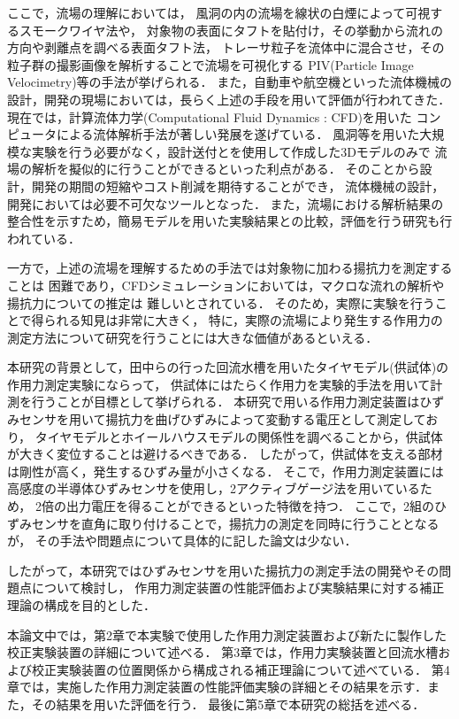 ここで，流場の理解においては，
風洞の内の流場を線状の白煙によって可視するスモークワイヤ法\cite{1994_smokewire}や，
対象物の表面にタフトを貼付け，その挙動から流れの方向や剥離点を調べる表面タフト法\cite{1994_taft}，
トレーサ粒子を流体中に混合させ，その粒子群の撮影画像を解析することで流場を可視化する
PIV(Particle Image Velocimetry)\cite{1999_PIV}等の手法が挙げられる．
また，自動車や航空機といった流体機械の設計，開発の現場においては，長らく上述の手段を用いて評価が行われてきた．\cite{1974_automobile}
現在では，計算流体力学(Computational Fluid Dynamics : CFD)を用いた
コンピュータによる流体解析手法が著しい発展を遂げている．
風洞等を用いた大規模な実験を行う必要がなく，設計送付とを使用して作成した3Dモデルのみで
流場の解析を擬似的に行うことができるといった利点がある．
そのことから設計，開発の期間の短縮やコスト削減を期待することができ，
流体機械の設計，開発\cite{2013_aircraft}\cite{1996_ship}においては必要不可欠なツールとなった．
また，流場における解析結果の整合性を示すため，簡易モデルを用いた実験結果との比較，評価を行う研究\cite{2007_CFD_comparison}も行われている．

一方で，上述の流場を理解するための手法では対象物に加わる揚抗力を測定することは
困難であり，CFDシミュレーションにおいては，マクロな流れの解析や揚抗力についての推定は
難しいとされている．\cite{2001_CFD_kobe}
そのため，実際に実験を行うことで得られる知見は非常に大きく，
特に，実際の流場により発生する作用力の測定方法について研究を行うことには大きな価値があるといえる．

本研究の背景として，田中ら\cite{2019_master}の行った回流水槽を用いたタイヤモデル(供試体)の作用力測定実験にならって，
供試体にはたらく作用力を実験的手法を用いて計測を行うことが目標として挙げられる．
本研究で用いる作用力測定装置はひずみセンサを用いて揚抗力を曲げひずみによって変動する電圧として測定しており，
タイヤモデルとホイールハウスモデルの関係性を調べることから，供試体が大きく変位することは避けるべきである．
したがって，供試体を支える部材は剛性が高く，発生するひずみ量が小さくなる．
そこで，作用力測定装置には高感度の半導体ひずみセンサを使用し，2アクティブゲージ法\cite{2006_strainsensor}を用いているため，
2倍の出力電圧を得ることができるといった特徴を持つ．
ここで，2組のひずみセンサを直角に取り付けることで，揚抗力の測定を同時に行うこととなるが，
その手法や問題点について具体的に記した論文は少ない．

\newpage

したがって，本研究ではひずみセンサを用いた揚抗力の測定手法の開発やその問題点について検討し，
作用力測定装置の性能評価および実験結果に対する補正理論の構成を目的とした．

本論文中では，第2章で本実験で使用した作用力測定装置および新たに製作した校正実験装置の詳細について述べる．
第3章では，作用力実験装置と回流水槽および校正実験装置の位置関係から構成される補正理論について述べている．
第4章では，実施した作用力測定装置の性能評価実験の詳細とその結果を示す．また，その結果を用いた評価を行う．
最後に第5章で本研究の総括を述べる．
